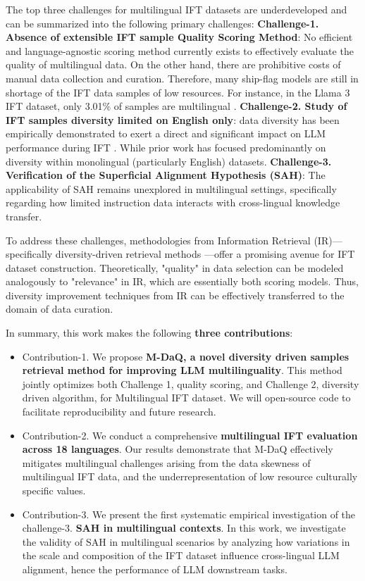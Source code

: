 \documentclass[sigconf]{acmart}
\begin{document}
The top three challenges for multilingual IFT datasets are underdeveloped and can be summarized into the following primary challenges:
\textbf{Challenge-1. Absence of extensible IFT sample Quality Scoring Method}: No efficient and language-agnostic scoring method currently exists to effectively evaluate the quality of multilingual data. On the other hand, there are prohibitive costs of manual data collection and curation. Therefore, many ship-flag models are still in shortage of the IFT data samples of low resources. For instance, in the Llama 3 IFT dataset, only 3.01\% of samples are multilingual \cite{llama_3}. 
\textbf{Challenge-2. Study of IFT samples diversity limited on English only}: data diversity has been empirically demonstrated to exert a direct and significant impact on LLM performance during IFT \cite{TACOS}. While prior work has focused predominantly on diversity within monolingual (particularly English) datasets.
\textbf{Challenge-3. Verification of the Superficial Alignment Hypothesis (SAH)}: The applicability of SAH remains unexplored in multilingual settings, specifically regarding how limited instruction data interacts with cross-lingual knowledge transfer. 

To address these challenges, methodologies from Information Retrieval (IR)—specifically diversity-driven retrieval methods \cite{DIVERGE,diversitydrivenqueryrewriting}—offer a promising avenue for IFT dataset construction. Theoretically, "quality" in data selection can be modeled analogously to "relevance" in IR, which are essentially both scoring models. Thus, diversity improvement techniques from IR can be effectively transferred to the domain of data curation.

In summary, this work makes the following \textbf{three contributions}:
\begin{itemize}
    \item Contribution-1. We propose \textbf{M-DaQ, a novel diversity driven samples retrieval method for improving LLM multilinguality}. This method jointly optimizes both Challenge 1, quality scoring, and Challenge 2, diversity driven algorithm, for Multilingual IFT dataset. We will open-source code to facilitate reproducibility and future research.
    \item Contribution-2. We conduct a comprehensive \textbf{multilingual IFT evaluation across 18 languages}. Our results demonstrate that M-DaQ effectively mitigates multilingual challenges arising from the data skewness of multilingual IFT data, and the underrepresentation of low resource culturally specific values.
    \item Contribution-3. We present the first systematic empirical investigation of the challenge-3. \textbf{SAH in multilingual contexts}. In this work, we investigate the validity of SAH in multilingual scenarios by analyzing how variations in the scale and composition of the IFT dataset influence cross-lingual LLM alignment, hence the performance of LLM downstream tasks.
\end{itemize}
\end{document}
